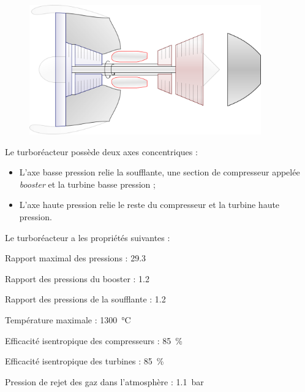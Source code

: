 	\begin{figure}
		\begin{center}
		\includegraphics[width=10cm]{images/circuit_turbofan_twin_spool.png}
		\end{center}
		\label{fig_cf6_2}
	\end{figure}
	
	Le turboréacteur possède deux axes concentriques :
		
	\begin{itemize}
		\item L’axe basse pression relie la soufflante, une section de compresseur appelée \textit{booster} et la turbine basse pression ;
		\item L’axe haute pression relie le reste du compresseur et la turbine haute pression.
	\end{itemize}	

	Le turboréacteur a les propriétés suivantes :
		
	\begin{description}
		\item Rapport maximal des pressions : 						\tab \num{29,3}
		\item Rapport des pressions du booster : 					\tab \num{1,2}
		\item Rapport des pressions de la soufflante : 			\tab \num{1,2}
		\item Température maximale : 									\tab \SI{1300}{\degreeCelsius}
		\item Efficacité isentropique des compresseurs : 		\tab \SI{85}{\percent}
		\item Efficacité isentropique des turbines : 			\tab \SI{85}{\percent}
		\item Pression de rejet des gaz dans l’atmosphère : 	\tab \SI{1,1}{\bar}
	\end{description}

